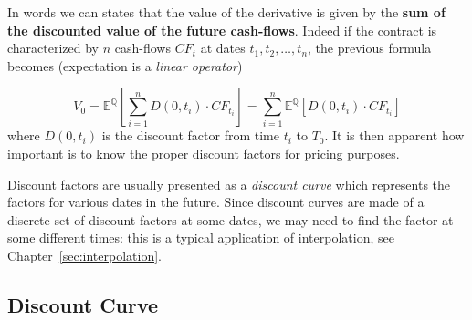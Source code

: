 In words we can states that the value of the derivative is given by the \textbf{sum of the discounted value of the future cash-flows}. Indeed if the contract is characterized by $n$ cash-flows $CF_t$ at dates $t_1, t_2, \dots, t_n$, the previous formula becomes (expectation is a \textit{linear operator})

$$V_0 = \mathbb{E}^{\mathbb{Q}} \left[  \sum_{i=1}^{n} D(0, t_i) \cdot CF_{t_i} \right] = \sum_{i=1}^{n} \mathbb{E}^{\mathbb{Q}} \left[ D(0, t_i) \cdot CF_{t_i} \right] $$
where $D(0, t_i)$ is the discount factor from time $t_i$ to $T_0$. It is then apparent how important is to know the proper discount factors for pricing purposes.

Discount factors are usually presented as a \emph{discount curve} which represents the factors for various dates in the future. 
Since discount curves are made of a discrete set of discount factors at some dates, we may need to find the factor at some different times: this is a typical application of interpolation, see Chapter~\ref{sec:interpolation}.

\subsection{Discount Curve}

